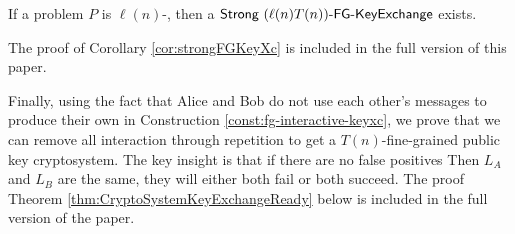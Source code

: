 \begin{corollary}\label{cor:strongFGKeyXc}
	If a problem $P$ is $\ell(n)$-\keyER, then a $\textsf{Strong } (\ell(n)T(n))\textsf{-FG-KeyExchange}$ exists.
\end{corollary}
The proof of Corollary \ref{cor:strongFGKeyXc} is included in the full version of this paper. 

Finally, using the fact that Alice and Bob do not use each other's messages to produce their own in Construction \ref{const:fg-interactive-keyxc}, we prove that we can remove all interaction through repetition to get a $T(n)$-fine-grained public key cryptosystem. The key insight is that if there are no false positives Then $L_A$ and $L_B$ are the same, they will either both fail or both succeed. The proof Theorem \ref{thm:CryptoSystemKeyExchangeReady} below is included in the full version of the paper. 


